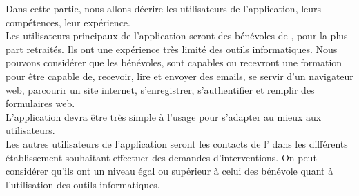 Dans cette partie, nous allons décrire les utilisateurs de l'application, leurs compétences, leur expérience.\\

Les utilisateurs principaux de l'application seront des bénévoles de \client{}, pour la plus part retraités. Ils ont une expérience très limité des outils informatiques. Nous pouvons considérer que les bénévoles, sont capables ou recevront une formation pour être capable de, recevoir, lire et envoyer des emails, se servir d'un navigateur web, parcourir un site internet, s'enregistrer, s'authentifier et remplir des formulaires web.\\

L'application devra être très simple à l'usage pour s'adapter au mieux aux utilisateurs.\\

Les autres utilisateurs de l'application seront les contacts de l'\client{} dans les différents établissement souhaitant effectuer des demandes d'interventions. On peut considérer qu'ils ont un niveau égal ou supérieur à celui des bénévole quant à l'utilisation des outils informatiques.